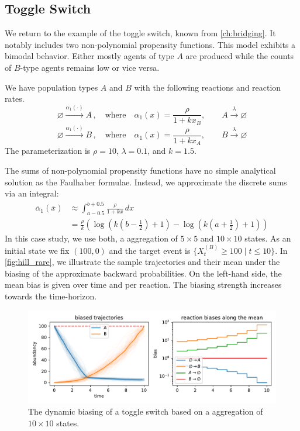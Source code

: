 \subsection{Toggle Switch}
We return to the example of the toggle switch, known from \autoref{ch:bridging}.
It notably includes two non-polynomial propensity functions.
This model exhibits a bimodal behavior.
Either mostly agents of type $A$ are produced while the counts of
$B$-type agents remains low or vice versa.
\begin{model}\label{model:hill_toggle_rare}
  We have population types $A$ and $B$ with the following reactions
  and reaction rates.
  $$ \varnothing \xrightarrow{\alpha_1(\cdot)} A\,,\quad
  \text{where}\quad \alpha_1(x) = \frac{\rho}{1 + k x_B},
  \qquad A \xrightarrow\lambda \varnothing $$
  $$ \varnothing \xrightarrow{\alpha_1(\cdot)} B\,,\quad
  \text{where}\quad \alpha_1(x) = \frac{\rho}{1 + k x_A},
  \qquad B \xrightarrow\lambda \varnothing $$
  The parameterization is $\rho=10$, $\lambda=0.1$, and $k=1.5$.
\end{model}
The sums of non-polynomial propensity functions have no simple
analytical solution as the Faulhaber formulae.
Instead, we approximate the discrete sums via an integral:
\[
  \begin{split}
    \bar{\alpha}_1(\bar{x})&\approx\int_{a-0.5}^{b+0.5} \frac{\rho}{1
    + kx}\, dx\\
    &= \frac{\rho}{k} \left(\log{\left(k\left(b - \frac{1}{2}\right)
    + 1\right)} - \log{\left(k\left(a + \frac{1}{2}\right) + 1 \right)} \right)
  \end{split}
\]
In this case study, we use both, a aggregation of $5\times 5$ and
$10\times10$ states.
As an initial state we fix $(100, 0)$ and the target event is
\(\{X_t^{(B)} \geq 100 \mid t\leq 10 \}\).
In \autoref{fig:hill_rare}, we illustrate the sample trajectories and
their mean under the biasing of the approximate backward probabilities.
On the left-hand side, the mean bias is given over time and per reaction.
The biasing strength increases towards the time-horizon.
\begin{figure}[htb]
  \centering
  \includegraphics[width=\textwidth]{gfx/hill_toggle_is.pdf}
  \caption[Dynamic biasing for the toggle
  switch]{\label{fig:hill_rare}The dynamic biasing of a toggle switch
  based on a aggregation of $10\times 10$ states.}
\end{figure}

